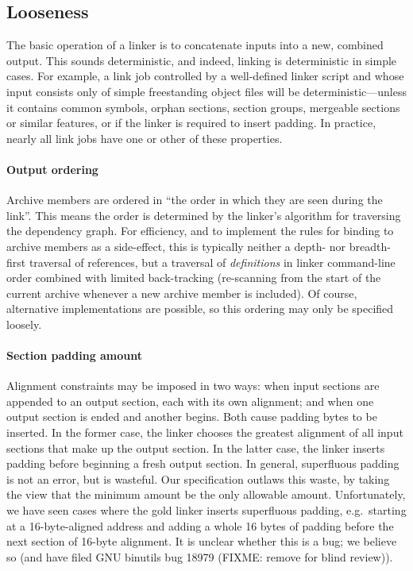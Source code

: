 
\subsection{Looseness}

The basic operation of a linker is to concatenate inputs 
into a new, combined output. 
This sounds deterministic, and indeed, linking is deterministic in simple cases.
For example, a link job controlled by a well-defined linker script
and whose input consists only of simple freestanding object files
will be deterministic---unless it contains common symbols, 
orphan sections, section groups, mergeable sections or similar features,
or if the linker is required to insert padding.
In practice, nearly all link jobs have one or other of these properties.

\paragraph{Output ordering}
Archive members are ordered in ``the order in which they are seen during the link''.
This means the order is determined by the linker's algorithm for
traversing the dependency graph. 
For efficiency, 
and to implement the rules for binding to archive members as a side-effect, 
this is typically neither a depth- nor breadth-first traversal of references,
but a traversal of \emph{definitions} in linker command-line order
combined with limited back-tracking 
(re-scanning from the start of the current archive whenever a new archive
member is included).
Of course, alternative implementations are possible, 
so this ordering may only be specified loosely.

\paragraph{Section padding amount}
Alignment constraints may be imposed 
in two ways: when input sections are appended to an output section, 
each with its own alignment; 
and when one output section is ended and another begins.
Both cause padding bytes to be inserted. 
In the former case, the linker chooses the greatest alignment of all input sections
that make up the output section.
In the latter case, the linker inserts padding before beginning a fresh output section.
In general, superfluous padding is not an error, but 
is wasteful.
Our specification outlaws this waste, 
by taking the view that the minimum amount be the only allowable amount.
Unfortunately, we have seen cases where the \textsf{gold} linker inserts
superfluous padding, e.g.\ starting at a 16-byte-aligned address
and adding a whole 16 bytes of padding
before the next section of 16-byte alignment.
It is unclear whether this is a bug; 
we believe so (and have filed GNU binutils bug 18979 (FIXME: remove for blind review)).

